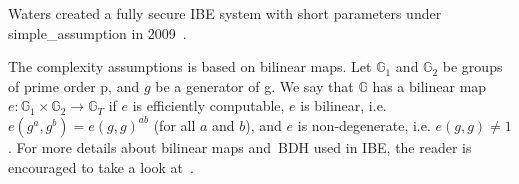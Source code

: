 Waters created a fully secure \gls{IBE} system with short parameters under \gls{simple_assumption} in 2009~\cite{DBLP:conf/crypto/Waters09}.

The complexity assumptions is based on bilinear maps.
Let $\mathbb{G}_1$ and $\mathbb{G}_2$ be groups of prime order \gls{p}, and $g$ be a generator of \gls{g}. 
We say that $\mathbb{G}$ has a bilinear map $e : \mathbb{G}_1 \times \mathbb{G}_2 \to \mathbb{G}_T$ if $e$ is efficiently computable, $e$ is bilinear, i.e. $e(g^a, g^b) = e(g, g)^{ab}$ (for all $a$ and $b$), and $e$ is non-degenerate, i.e. $e(g,g)\neq 1$.
For more details about bilinear maps and~\gls{BDH} used in \gls{IBE}, the reader is encouraged to take a look at~\cite{DBLP:conf/crypto/BonehF01,DBLP:journals/iacr/Naccache05}.


